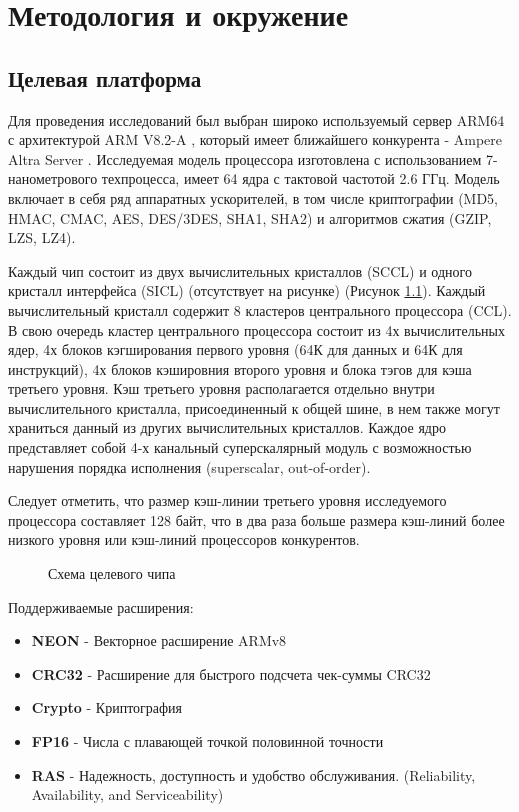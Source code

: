 \chapter{Методология и окружение}\label{ch:chMethod}
\section{Целевая платформа}


Для проведения исследований был выбран широко используемый сервер ARM64 с архитектурой ARM V8.2-A \cite{reid2016trustworthy,xia2021kunpeng}, который имеет ближайшего конкурента - Ampere Altra Server \cite{cha2021ampere}. Исследуемая модель процессора изготовлена с использованием 7-нанометрового техпроцесса, имеет 64 ядра с тактовой частотой 2.6 ГГц. Модель включает в себя  ряд аппаратных ускорителей, в том числе криптографии (MD5, HMAC, CMAC, AES, DES/3DES,  SHA1, SHA2) и  алгоритмов сжатия (GZIP, LZS, LZ4). 

Каждый чип состоит из двух вычислительных кристаллов (SCCL) и одного кристалл интерфейса (SICL) (отсутствует на рисунке) (Рисунок \ref{chip1}). Каждый вычислительный кристалл содержит 8 кластеров центрального процессора (CCL). В свою очередь кластер центрального процессора состоит из 4х вычислительных ядер, 4х блоков кэгширования первого уровня (64К для данных и 64К для инструкций), 4х блоков кэшировния второго уровня и блока тэгов для кэша третьего уровня. Кэш третьего уровня располагается отдельно внутри вычислительного кристалла, присоединенный к общей шине, в нем также могут храниться данный из других вычислительных кристаллов. Каждое ядро представляет собой 4-х канальный суперскалярный модуль с возможностью нарушения порядка исполнения (superscalar, out-of-order).

Следует отметить, что размер кэш-линии третьего уровня исследуемого процессора составляет 128 байт, что в два раза больше размера кэш-линий более низкого уровня или кэш-линий процессоров конкурентов. 

\begin{figure}[htbp]
	\centering
	
	\caption{Схема целевого чипа}
	\label{chip1}
\end{figure}

Поддерживаемые расширения:
\begin{itemize}
	\item  \textbf{NEON} - Векторное расширение ARMv8
	\item  \textbf{CRC32} - Расширение для быстрого подсчета чек-суммы CRC32
	\item  \textbf{Crypto} - Криптография
	\item  \textbf{FP16} - Числа с плавающей точкой половинной точности
	\item  \textbf{RAS} -  Надежность, доступность и удобство обслуживания. (Reliability, Availability, and Serviceability)
\end{itemize}

